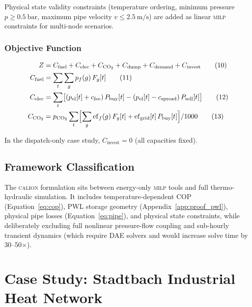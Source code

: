 \documentclass[a4paper,fleqn]{cas-sc}
\newcommand{\milp}{\textsc{milp}}
\newcommand{\calion}{\textsc{calion}}
\begin{document}
Physical state validity constraints (temperature ordering, minimum pressure
$p \geq \SI{0.5}{\bar}$, maximum pipe velocity $v \leq \SI{2.5}{\metre\per\second}$)
are added as linear \milp{} constraints for multi-node scenarios.

\subsubsection{Objective Function}

\begin{align}
  Z &= C_{\mathrm{fuel}} + C_{\mathrm{elec}} + C_{\mathrm{CO_2}}
       + C_{\mathrm{dump}} + C_{\mathrm{demand}} + C_{\mathrm{invest}}
       \tag{10} \label{eq:obj}\\
  C_{\mathrm{fuel}} &= \sum_t \sum_g p_f(g)\,F_g[t] \tag{11}\\
  C_{\mathrm{elec}} &= \sum_t \bigl[(p_{\mathrm{el}}[t] + c_{\mathrm{fee}})\,P_{\mathrm{buy}}[t]
                       - (p_{\mathrm{el}}[t] - c_{\mathrm{spread}})\,P_{\mathrm{sell}}[t]\bigr]
                       \tag{12}\\
  C_{\mathrm{CO_2}} &= p_{\mathrm{CO_2}} \sum_t
                       \Bigl[\sum_g \mathrm{ef}_f(g)\,F_g[t]
                       + \mathrm{ef}_{\mathrm{grid}}[t]\,P_{\mathrm{buy}}[t]\Bigr]/1000
                       \tag{13}
\end{align}

In the dispatch-only case study, $C_{\mathrm{invest}} = 0$ (all capacities fixed).

\subsection{Framework Classification}

The \calion{} formulation sits between energy-only \milp{} tools and full
thermo-hydraulic simulation.  It includes temperature-dependent COP
(Equation~\ref{eq:cop}), PWL storage geometry (Appendix~\ref{app:proof_pwl}),
physical pipe losses (Equation~\ref{eq:pipe}), and physical state constraints,
while deliberately excluding full nonlinear pressure-flow coupling and
sub-hourly transient dynamics (which require DAE solvers and would increase
solve time by 30--50$\times$).

\section{Case Study: Stadtbach Industrial Heat Network}
\label{sec:case}
\end{document}
